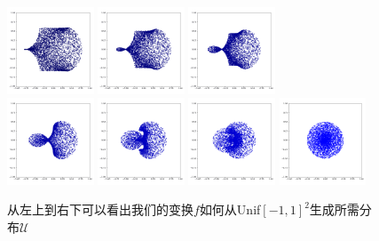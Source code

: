 \documentclass[lang=cn,11pt]{elegantpaper}
\begin{document}
\begin{figure}[hbt]
  \includegraphics[width=0.23\textwidth]{circle_1_6}
  \includegraphics[width=0.23\textwidth]{circle_1_7}
  \includegraphics[width=0.23\textwidth]{circle_1_71}\\
  \includegraphics[width=0.23\textwidth]{circle_1_8}
  \includegraphics[width=0.23\textwidth]{circle_1_81}
  \includegraphics[width=0.23\textwidth]{circle_1_9}
  \includegraphics[width=0.23\textwidth]{circle_1_10}  
  
  \caption{从左上到右下可以看出我们的变换$f$如何从Unif$[-1,1]^2$生成所需分布$\mathcal U$}
\end{figure}
\end{document}
